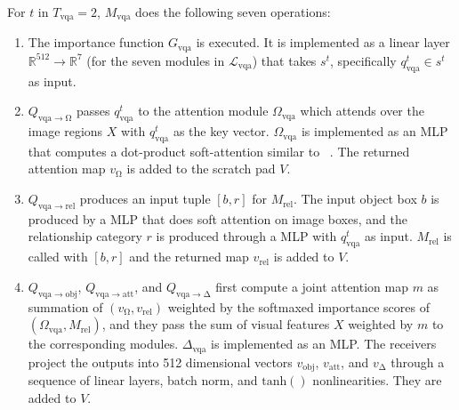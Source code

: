 \documentclass{article}
\makeatletter
\newcommand{\SK}[1]{{\color{NavyBlue}{[@Seung: #1]}}}
\def\Mrel{M_\mathrm{rel}}
\makeatother
\begin{document}
For $t$ in $T_{\mathrm{vqa}}=2$, $M_\mathrm{vqa}$ does the following seven operations:
\vspace{-2mm}\begin{enumerate}[\hspace{0pt}(1)]
\item{
The importance function $G_\mathrm{vqa}$ is executed. It is implemented as a linear layer $\mathbb{R}^{512} \to \mathbb{R}^7$ (for the seven modules in $\mathcal L_\mathrm{vqa}$) that takes $s^t$, specifically $q_\mathrm{vqa}^t \in s^t$ as input.
} 

\item{
$Q_{\mathrm{vqa}\rightarrow \mathrm{\Omega}}$ passes $q_{\mathrm{vqa}}^t$ to the attention module $\Omega_\mathrm{vqa}$ which attends over the image regions $X$ with $q_{\mathrm{vqa}}^t$ as the key vector.
$\Omega_\mathrm{vqa}$ is implemented as an MLP that computes a dot-product soft-attention similar to ~\citet{yang16san}. The returned attention map $v_\mathrm{\Omega}$ is added to the scratch pad $V$.
} 

\item{
$Q_{\mathrm{vqa}\rightarrow \mathrm{rel}}$ produces an input tuple $[b, r]$ for $\Mrel$.
The input object box $b$ is produced by a MLP that does soft attention on image boxes, and the relationship category $r$ is produced through a MLP with $q_{\mathrm{vqa}}^t$ as input.
$\Mrel$ is called with $[b, r]$ and the returned map $v_\mathrm{rel}$ is added to $V$.
} 

\item{
$Q_{\mathrm{vqa}\rightarrow\mathrm{obj}}$, $Q_{\mathrm{vqa}\rightarrow\mathrm{att}}$, and $Q_{\mathrm{vqa}\rightarrow\mathrm{\Delta}}$ first compute a joint attention map $m$ as summation of $(v_\mathrm{\Omega}, v_\mathrm{rel})$ weighted by the softmaxed importance scores of $(\Omega_\mathrm{vqa}, \Mrel)$,
and they pass the sum of visual features $X$ weighted by $m$ to the corresponding modules.
$\Delta_\mathrm{vqa}$ is implemented as an MLP.
The receivers project the outputs into 512 dimensional vectors $v_\mathrm{obj}$, $v_\mathrm{att}$, and $v_\mathrm{\Delta}$ through a sequence of linear layers, batch norm, and $\mathrm{tanh}()$ nonlinearities. They are added to $V$.
} 


\end{enumerate}
\end{document}
